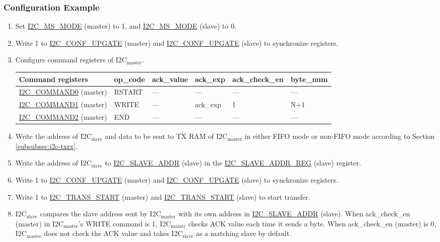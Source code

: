 \documentclass[main\_\_EN.tex]{subfiles}
\begin{document}
\subsubsection{Configuration Example}
\begin{enumerate}
\item Set \hyperref[fielddesc:I2CMSMODE]{I2C\_MS\_MODE} (master) to 1, and \hyperref[fielddesc:I2CMSMODE]{I2C\_MS\_MODE} (slave) to 0.
\item Write 1 to \hyperref[fielddesc:I2CCONFUPGATE]{I2C\_CONF\_UPGATE} (master) and \hyperref[fielddesc:I2CCONFUPGATE]{I2C\_CONF\_UPGATE} (slave) to synchronize registers.
\item Configure command registers of I2C$_\text{master}$.
\begin{longtable}{ | p{4.5cm} | p{1.8cm} | p{1.8cm} | p{1.8cm} |p{2.2cm} | p{1.8cm}|}
\hline\rowcolor{lightgray}
Command registers& op\_code & ack\_value&ack\_exp&ack\_check\_en&byte\_num  \\ \hline
\hyperref[fielddesc:I2CCOMMAND0]{I2C\_COMMAND0} (master)& RSTART& ---&---&---&---  \\ \hline
\hyperref[fielddesc:I2CCOMMAND1]{I2C\_COMMAND1} (master)& WRITE& ---&ack\_exp&1&N+1  \\ \hline
\hyperref[fielddesc:I2CCOMMAND2]{I2C\_COMMAND2} (master)& END& ---&---&---&---  \\ \hline
\end{longtable}
\item Write the address of I2C$_\text{slave}$ and data to be sent to TX RAM of I2C$_\text{master}$ in either FIFO mode or non-FIFO mode according to Section \ref{subsubsec:i2c-txrx}.
\item Write the address of I2C$_\text{slave}$ to \hyperref[fielddesc:I2CSLAVEADDR]{I2C\_SLAVE\_ADDR} (slave) in the \hyperref[regdesc:I2CSLAVEADDRREG]{I2C\_SLAVE\_ADDR\_REG} (slave) register.
\item Write 1 to \hyperref[fielddesc:I2CCONFUPGATE]{I2C\_CONF\_UPGATE} (master) and \hyperref[fielddesc:I2CCONFUPGATE]{I2C\_CONF\_UPGATE} (slave) to synchronize registers.
\item Write 1 to \hyperref[fielddesc:I2CTRANSSTART]{I2C\_TRANS\_START} (master) and \hyperref[fielddesc:I2CTRANSSTART]{I2C\_TRANS\_START} (slave) to start transfer.
\item I2C$_\text{slave}$ compares the slave address sent by I2C$_\text{master}$ with its own address in \hyperref[fielddesc:I2CSLAVEADDR]{I2C\_SLAVE\_ADDR} (slave). When ack\_check\_en (master) in I2C$_\text{master}$'s WRITE command is 1, I2C$_\text{master}$ checks ACK value each time it sends a byte. When ack\_check\_en (master) is 0, I2C$_\text{master}$ does not check the ACK value and takes I2C$_\text{slave}$ as a matching slave by default.

\end{enumerate}
\end{document}
